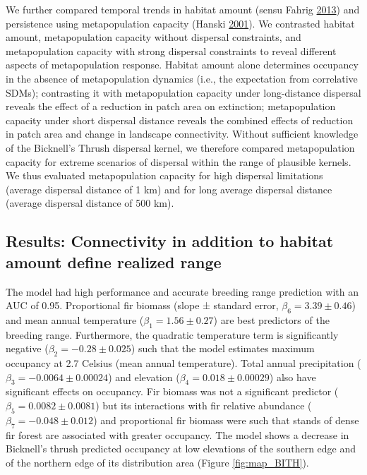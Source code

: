 \documentclass[12pt]{article}
\begin{document}
We further compared temporal trends in habitat amount (sensu Fahrig
\protect\hyperlink{ref-fahrig_rethinking_2013}{2013}) and persistence
using metapopulation capacity (Hanski
\protect\hyperlink{ref-hanski_spatially_2001}{2001}). We contrasted
habitat amount, metapopulation capacity without dispersal constraints,
and metapopulation capacity with strong dispersal constraints to reveal
different aspects of metapopulation response. Habitat amount alone
determines occupancy in the absence of metapopulation dynamics (i.e.,
the expectation from correlative SDMs); contrasting it with
metapopulation capacity under long-distance dispersal reveals the effect
of a reduction in patch area on extinction; metapopulation capacity
under short dispersal distance reveals the combined effects of reduction
in patch area and change in landscape connectivity. Without sufficient
knowledge of the Bicknell's Thrush dispersal kernel, we therefore
compared metapopulation capacity for extreme scenarios of dispersal
within the range of plausible kernels. We thus evaluated metapopulation
capacity for high dispersal limitations (average dispersal distance of 1
km) and for long average dispersal distance (average dispersal distance
of 500 km).

\hypertarget{results-connectivity-in-addition-to-habitat-amount-define-realized-range}{%
\subsection{Results: Connectivity in addition to habitat amount define
realized
range}\label{results-connectivity-in-addition-to-habitat-amount-define-realized-range}}

The model had high performance and accurate breeding range prediction
with an AUC of 0.95. Proportional fir biomass (slope ± standard error,
\(\beta_6 = 3.39 \pm 0.46\)) and mean annual temperature
(\(\beta_1 = 1.56 \pm 0.27\)) are best predictors of the breeding range.
Furthermore, the quadratic temperature term is significantly negative
(\(\beta_2 = -0.28 \pm 0.025\)) such that the model estimates maximum
occupancy at 2.7 Celsius (mean annual temperature). Total annual
precipitation (\(\beta_3 = -0.0064 \pm 0.00024\)) and elevation
(\(\beta_4 = 0.018 \pm 0.00029\)) also have significant effects on
occupancy. Fir biomass was not a significant predictor
(\(\beta_5 = 0.0082 \pm 0.0081\)) but its interactions with fir relative
abundance (\(\beta_7 = -0.048 \pm 0.012\)) and proportional fir biomass
were such that stands of dense fir forest are associated with greater
occupancy. The model shows a decrease in Bicknell's thrush predicted
occupancy at low elevations of the southern edge and of the northern
edge of its distribution area (Figure \ref{fig:map_BITH}).
\end{document}
